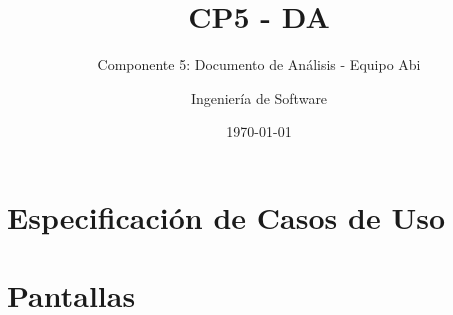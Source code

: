 \documentclass[10pt]{book}
\title{CP5 - DA}
\subtitle{Componente 5: Documento de Análisis - Equipo Abi}
\author{Ingeniería de Software}
\date{\today}
\begin{document}
\maketitle
\thispagestyle{empty}
\tableofcontents




%
\chapter{Especificación de Casos de Uso}

%



%
\chapter{Pantallas}

\end{document}
